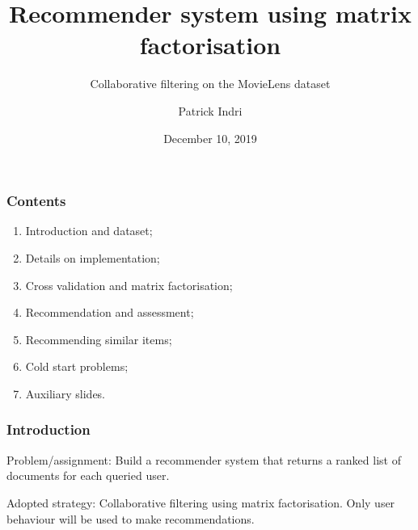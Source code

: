 \documentclass[xcolor = {table}]{beamer}
\title{Recommender system using matrix factorisation}
\subtitle{Collaborative filtering on the MovieLens dataset}
\author{Patrick Indri}
\date{December 10, 2019}
\institute{DSSC - Information Retrieval Exam}
\begin{document}
  \setcounter{showSlideNumbers}{0}

  \frame{\titlepage}


  \begin{frame} \frametitle{Contents}

    \begin{enumerate}
      \setlength\itemsep{10pt}
      \item Introduction and dataset;
      \item Details on implementation;
      \item Cross validation and matrix factorisation;
      \item Recommendation and assessment;
      \item Recommending similar items;
      \item Cold start problems;
      \item \textcolor{ThemeGrey}{Auxiliary slides.}
    \end{enumerate}

  \end{frame}


  \setcounter{framenumber}{0}
  \setcounter{showSlideNumbers}{1}


  \begin{frame}
    \frametitle{Introduction}

    \begin{block}{Problem/assignment:}
      Build a recommender system that returns a ranked list of documents for each queried user.
    \end{block}

    \vspace{2em}

    \pause

    \begin{block}{Adopted strategy:}
      Collaborative filtering using matrix factorisation. Only user behaviour will be used to make recommendations.\\
    \end{block}

  \end{frame}
\end{document}
